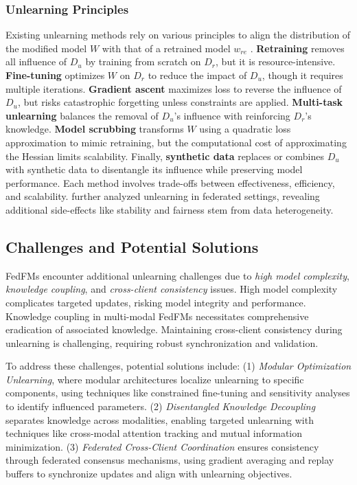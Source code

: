 \subsubsection{Unlearning Principles}

 Existing unlearning methods rely on various principles to align the distribution of the modified model $ W $ with that of a retrained model $ w_{re} $ \cite{liu2024survey}. \textbf{Retraining} removes all influence of $ D_u $ by training from scratch on $ D_r $, but it is resource-intensive. \textbf{Fine-tuning} optimizes $ W $ on $ D_r $ to reduce the impact of $ D_u $, though it requires multiple iterations. \textbf{Gradient ascent} maximizes loss to reverse the influence of $ D_u $, but risks catastrophic forgetting unless constraints are applied. \textbf{Multi-task unlearning} balances the removal of $ D_u $'s influence with reinforcing $ D_r $'s knowledge. \textbf{Model scrubbing} transforms $ W $ using a quadratic loss approximation to mimic retraining, but the computational cost of approximating the Hessian limits scalability. Finally, \textbf{synthetic data} replaces or combines $ D_u $ with synthetic data to disentangle its influence while preserving model performance. 
 Each method involves trade-offs between effectiveness, efficiency, and scalability.
 \citet{shao2024federated} further analyzed unlearning in federated settings, revealing additional side-effects like stability and fairness stem from data heterogeneity.



\subsection{Challenges and Potential Solutions}

FedFMs encounter additional unlearning challenges due to \textit{high model complexity}, \textit{knowledge coupling}, and \textit{cross-client consistency} issues. High model complexity complicates targeted updates, risking model integrity and performance. Knowledge coupling in multi-modal FedFMs necessitates comprehensive eradication of associated knowledge. Maintaining cross-client consistency during unlearning is challenging, requiring robust synchronization and validation.

To address these challenges, potential solutions include: (1) \textit{Modular Optimization Unlearning}, where modular architectures localize unlearning to specific components, using techniques like constrained fine-tuning and sensitivity analyses to identify influenced parameters. (2) \textit{Disentangled Knowledge Decoupling} separates knowledge across modalities, enabling targeted unlearning with techniques like cross-modal attention tracking and mutual information minimization. (3) \textit{Federated Cross-Client Coordination} ensures consistency through federated consensus mechanisms, using gradient averaging and replay buffers to synchronize updates and align with unlearning objectives.
